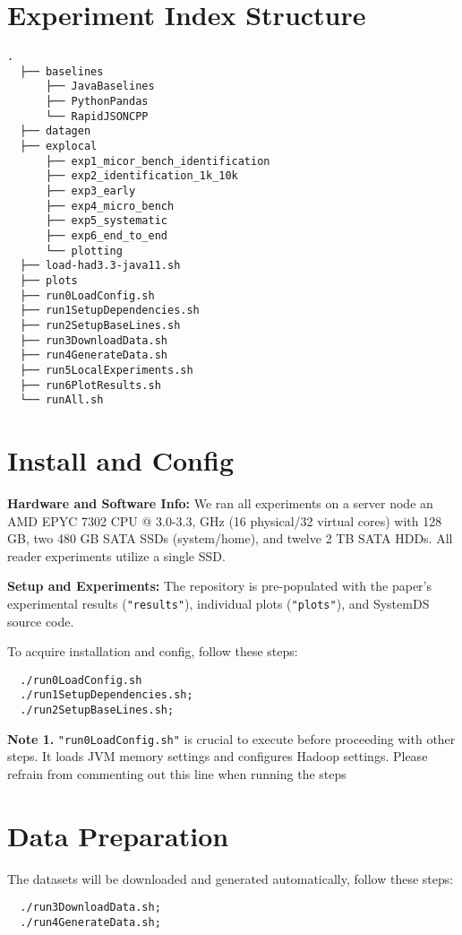 \documentclass[acmsmall,screen,pdfa]{acmart}
\begin{document}
\section{Experiment Index Structure}
\begin{lstlisting}[style=ascii-tree]
  .
  ├── baselines
      ├── JavaBaselines
      ├── PythonPandas
      └── RapidJSONCPP
  ├── datagen
  ├── explocal
      ├── exp1_micor_bench_identification
      ├── exp2_identification_1k_10k
      ├── exp3_early
      ├── exp4_micro_bench
      ├── exp5_systematic
      ├── exp6_end_to_end
      └── plotting
  ├── load-had3.3-java11.sh
  ├── plots
  ├── run0LoadConfig.sh
  ├── run1SetupDependencies.sh
  ├── run2SetupBaseLines.sh
  ├── run3DownloadData.sh
  ├── run4GenerateData.sh
  ├── run5LocalExperiments.sh
  ├── run6PlotResults.sh
  └── runAll.sh
\end{lstlisting}


\section{Install and Config}
\textbf{Hardware and Software Info:} We ran all experiments on a server node an AMD EPYC 7302 CPU @ 3.0-3.3, GHz (16 physical/32 virtual cores) with 128 GB, two 480 GB SATA SSDs (system/home), and twelve 2 TB SATA HDDs. All reader experiments utilize a single SSD.

\textbf{Setup and Experiments:} The repository is pre-populated with the paper's experimental results (\texttt{"results"}), individual plots (\texttt{"plots"}), and SystemDS source code. 

To acquire installation and config, follow these steps:
\begin{lstlisting}
  ./run0LoadConfig.sh
  ./run1SetupDependencies.sh;
  ./run2SetupBaseLines.sh;
\end{lstlisting}

\textbf{Note 1.} \texttt{"run0LoadConfig.sh"} is crucial to execute before proceeding with other steps. It loads JVM memory settings and configures Hadoop settings. Please refrain from commenting out this line when running the steps 

\section{Data Preparation}
The datasets will be downloaded and generated automatically, follow these steps:
\begin{lstlisting}
  ./run3DownloadData.sh;
  ./run4GenerateData.sh;
\end{lstlisting}
\end{document}
